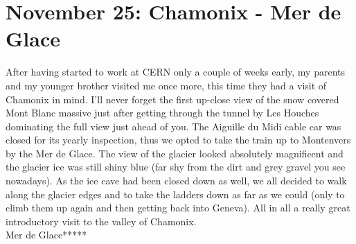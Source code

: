 \section{November 25: Chamonix - Mer de Glace}
\label{2006:Chamonix}

After having started to work at CERN only a couple of weeks early, my parents and my younger brother visited me once more, this time they had a visit of Chamonix in mind. I'll never forget the first up-close view of the snow covered Mont Blanc massive just after getting through the tunnel by Les Houches dominating the full view just ahead of you. The Aiguille du Midi cable car was closed for its yearly inspection, thus we opted to take the train up to Montenvers by the Mer de Glace. The view of the glacier looked absolutely magnificent and the glacier ice was still shiny blue (far shy from the dirt and grey gravel you see nowadays). As the ice cave had been closed down as well, we all decided to walk along the glacier edges and to take the ladders down as far as we could (only to climb them up again and then getting back into Geneva). All in all a really great introductory visit to the valley of Chamonix.\\

Mer de Glace*****\\